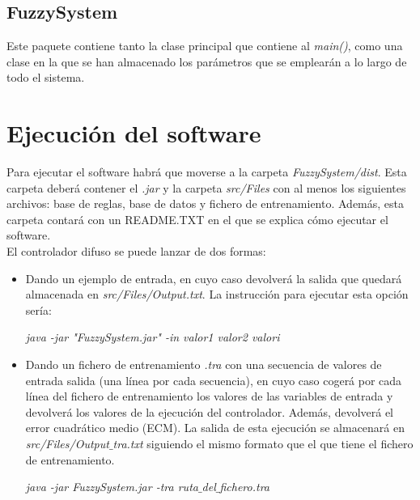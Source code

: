 \documentclass[12pt,a4paper]{article}
\begin{document}
\subsection{FuzzySystem}
Este paquete contiene tanto la clase principal que contiene al \textit{main()}, como una clase en la que se han almacenado los parámetros que se emplearán a lo largo de todo el sistema.


\section{Ejecución del software}
Para ejecutar el software habrá que moverse a la carpeta \textit{FuzzySystem/dist}. Esta carpeta deberá contener el \textit{.jar} y la carpeta \textit{src/Files} con al menos los siguientes archivos: base de reglas, base de datos y fichero de entrenamiento. Además, esta carpeta contará con un README.TXT en el que se explica cómo ejecutar el software.\\
El controlador difuso se puede lanzar de dos formas:
\begin{itemize}
\item Dando un ejemplo de entrada, en cuyo caso devolverá la salida que quedará almacenada en \textit{src/Files/Output.txt}. La instrucción para ejecutar esta opción sería:\\
\begin{center}
\textit{java -jar "FuzzySystem.jar" -in valor1 valor2 valori}
\end{center}
\item Dando un fichero de entrenamiento \textit{.tra} con una secuencia de valores de entrada salida (una línea por cada secuencia), en cuyo caso cogerá por cada línea del fichero de entrenamiento los valores de las variables de entrada y devolverá los valores de la ejecución del controlador. Además, devolverá el error cuadrático medio (ECM). La salida de esta ejecución se almacenará en \textit{src/Files/Output$\_$tra.txt} siguiendo el mismo formato que el que tiene el fichero de entrenamiento. 
\begin{center}
\textit{java -jar FuzzySystem.jar -tra ruta$\_$del$\_$fichero.tra}
\end{center}
\end{itemize}
\end{document}
